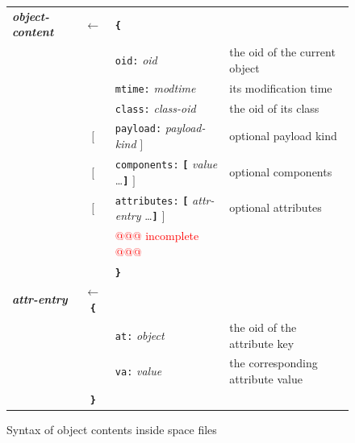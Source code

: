 \documentclass[11pt,a4paper,svgnames]{article}
\begin{document}

\begin{figure}[h]
  \begin {center}
    \begin{tabular}{lcll}
      \emph{\textbf{object-content}} & $\leftarrow$ & \textbf{\texttt{\{}} \\
      ~ & ~ & \texttt{oid:} \textit{oid} & the oid of the current object \\
      ~ & ~ & \texttt{mtime:} \textit{modtime} & its modification time  \\
      ~ & ~ & \texttt{class:} \textit{class-oid} & the oid of its class  \\
      ~ & $[$ & \texttt{payload:} \textit{payload-kind} $]$ & optional payload kind \\
      ~ & $[$ & \texttt{components:}  \textbf{\texttt{[}} \textit{value}  \ldots \textbf{\texttt{]}}  $]$ & optional components \\
      ~ & $[$ & \texttt{attributes:}  \textbf{\texttt{[}} \textit{attr-entry} \ldots \textbf{\texttt{]}} $]$ & optional attributes \\
      ~ & ~ & \textcolor{red}{@@@ incomplete @@@} \\
      ~ & ~ & \textbf{\texttt{\}}} \\
      \emph{\textbf{attr-entry}} & $\leftarrow$ \textbf{\texttt{\{}} \\
      ~ & ~ & \texttt{at:} \textit{object} & the oid of the attribute key \\
      ~ & ~ & \texttt{va:} \textit{value} & the corresponding attribute value \\
      ~ &  \textbf{\texttt{\}}} & \\
    \end{tabular}
  \end {center}
  \caption {Syntax of object contents inside space files}
\label{fig:hjson-object-contents}
  
\end{figure}
\end{document}
